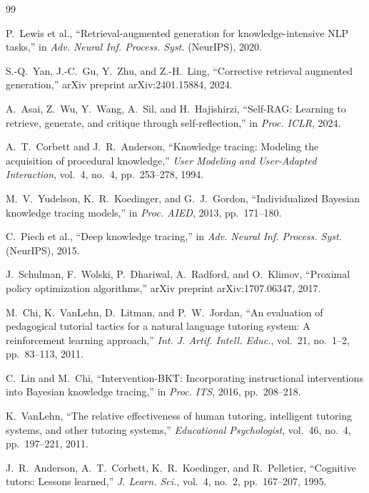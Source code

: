 \documentclass[conference]{IEEEtran}
\begin{document}
\begin{thebibliography}{99}

 P.~Lewis et al., ``Retrieval-augmented
generation for knowledge-intensive NLP tasks,'' in
\emph{Adv. Neural Inf. Process. Syst.} (NeurIPS), 2020.

 S.-Q.~Yan, J.-C.~Gu, Y.~Zhu, and Z.-H.~Ling,
``Corrective retrieval augmented generation,'' arXiv preprint
arXiv:2401.15884, 2024.

 A.~Asai, Z.~Wu, Y.~Wang, A.~Sil, and
H.~Hajishirzi, ``Self-RAG: Learning to retrieve, generate, and
critique through self-reflection,'' in \emph{Proc. ICLR}, 2024.

 A.~T.~Corbett and J.~R.~Anderson,
``Knowledge tracing: Modeling the acquisition of procedural
knowledge,'' \emph{User Modeling and User-Adapted Interaction},
vol.~4, no.~4, pp.~253--278, 1994.

 M.~V.~Yudelson, K.~R.~Koedinger, and
G.~J.~Gordon, ``Individualized Bayesian knowledge tracing models,''
in \emph{Proc. AIED}, 2013, pp.~171--180.

 C.~Piech et al., ``Deep knowledge tracing,''
in \emph{Adv. Neural Inf. Process. Syst.} (NeurIPS), 2015.

 J.~Schulman, F.~Wolski, P.~Dhariwal,
A.~Radford, and O.~Klimov, ``Proximal policy optimization
algorithms,'' arXiv preprint arXiv:1707.06347, 2017.

 M.~Chi, K.~VanLehn, D.~Litman, and P.~W.~Jordan,
``An evaluation of pedagogical tutorial tactics for a natural
language tutoring system: A reinforcement learning approach,''
\emph{Int. J. Artif. Intell. Educ.}, vol.~21, no.~1--2,
pp.~83--113, 2011.

 C.~Lin and M.~Chi, ``Intervention-BKT:
Incorporating instructional interventions into Bayesian knowledge
tracing,'' in \emph{Proc. ITS}, 2016, pp.~208--218.

 K.~VanLehn, ``The relative effectiveness of
human tutoring, intelligent tutoring systems, and other tutoring
systems,'' \emph{Educational Psychologist}, vol.~46, no.~4,
pp.~197--221, 2011.

 J.~R.~Anderson, A.~T.~Corbett,
K.~R.~Koedinger, and R.~Pelletier, ``Cognitive tutors: Lessons
learned,'' \emph{J. Learn. Sci.}, vol.~4, no.~2, pp.~167--207,
1995.


\end{thebibliography}
\end{document}
